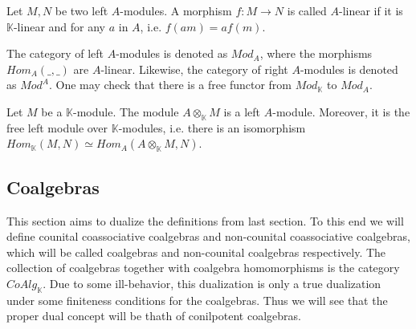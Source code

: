 \documentclass[../thesis.tex]{subfiles}
\begin{document}
\begin{definition}[Modules]
\begin{center}
                \end{center}
            \end{definition}

            \begin{definition}
                Let $M,N$ be two left $A$-modules. A morphism $f:M\rightarrow N$ is called $A$-linear if it is $\mathbb{K}$-linear and for any $a$ in $A$, i.e. $f(am) = af(m)$.
            \end{definition}

            The category of left $A$-modules is denoted as $Mod_A$, where the morphisms $Hom_A(\_,\_)$ are $A$-linear. Likewise, the category of right $A$-modules is denoted as $Mod^A$. One may check that there is a free functor from $Mod_\mathbb{K}$ to $Mod_A$.

            \begin{proposition}
                Let $M$ be a $\mathbb{K}$-module. The module $A\otimes_{\mathbb{K}}M$ is a left $A$-module. Moreover, it is the free left module over $\mathbb{K}$-modules, i.e. there is an isomorphism $Hom_{\mathbb{K}}(M,N)\simeq Hom_{A}(A\otimes_{\mathbb{K}}M,N)$.
            \end{proposition}
            
    \subsection{Coalgebras}
            This section aims to dualize the definitions from last section. To this end we will define counital coassociative coalgebras and non-counital coassociative coalgebras, which will be called coalgebras and non-counital coalgebras respectively. The collection of coalgebras together with coalgebra homomorphisms is the category $CoAlg_{\mathbb{K}}$. Due to some ill-behavior, this dualization is only a true dualization under some finiteness conditions for the coalgebras. Thus we will see that the proper dual concept will be thath of conilpotent coalgebras.
\end{document}

